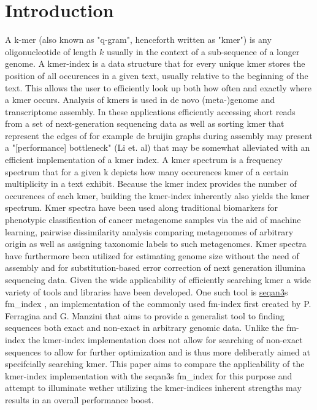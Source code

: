 \chapter{Introduction}
A k-mer (also known as "q-gram", henceforth written as "kmer") is any oligonucleotide of length $k$ usually in the
context of a sub-sequence of a longer genome. A kmer-index is a data structure that for every unique kmer
stores the position of all occurences in a given text, usually relative to the beginning of the text.
This allows the user to efficiently look up both how often and exactly where a kmer occurs.
Analysis of kmers is used in de novo (meta-)genome\cite{megahit} and transcriptome\cite{SOAPdenovo-Trans} assembly.
In these applications efficiently accessing short reads from a set of next-generation sequencing data as well as sorting
kmer that represent the edges of for example de bruijin graphs during assembly may present a
"[performance] bottleneck" (Li et. al) that may be somewhat alleviated with an efficient implementation of a kmer index.
\newline
A kmer spectrum is a frequency spectrum that for a given k depicts how many occurences kmer of a certain multiplicity in a text
exhibit. %
Because the kmer index provides the number of occurences of each kmer, building the kmer-index inherently also yields
the kmer spectrum. Kmer spectra have been used along traditional biomarkers for phenotypic classification of cancer
metagenome samples via the aid of machine learning\cite{phenotype:classification:with:kmer:spectrum}, pairwise dissimilarity
analysis comparing metagenomes of arbitrary origin\cite{kmer:spectrum:dissimilarity} as well as assigning taxonomic labels
to such metagenomes\cite{kraken:metagenome:classification}. Kmer spectra have furthermore been utilized for estimating genome
size without the need of assembly\cite{genome:size:estimation} and for substitution-based error correction
of next generation illumina sequencing data\cite{musket:kmer:spectrum:error:correction}.
\newline
Given the wide applicability of efficiently searching kmer a wide variety of tools and libraries have been developed.
One such tool is \href{https://github.com/seqan/seqan3}{seqan3}s fm\_index \cite{fm:index:master:thesis}, an implementation
of the commonly used fm-index first created by P. Ferragina and G. Manzini \cite{original:fm} that aims to provide a generalist
tool to finding sequences both exact and non-exact in arbitrary genomic data.
Unlike the fm-index the kmer-index implementation does not allow for searching of non-exact sequences to allow for further
optimization and is thus more deliberatly aimed at specifcially searching kmer. This paper aims to compare the applicability
of the kmer-index implementation with the seqan3s fm\_index for this purpose and attempt to illuminate wether utilizing
the kmer-indices inherent strengths may results in an overall performance boost.